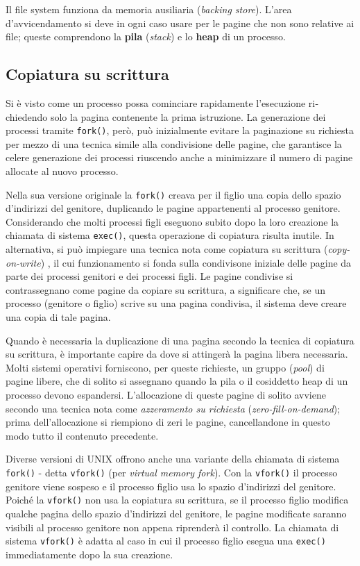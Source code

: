 \documentclass[11pt,a4paper]{article}
\begin{document}
Il file system funziona da memoria ausiliaria (\emph{backing store}). L'area d'avvicendamento si deve in ogni caso usare per le pagine che non sono re­lative ai file; queste comprendono la \textbf{pila} (\emph{stack}) e lo \textbf{heap} di un processo.

\subsection{Copiatura su scrittura}
Si è visto come un processo possa cominciare rapidamente l'esecuzione ri­chiedendo solo la pagina contenente la prima istruzione. La generazione dei processi trami­te \texttt{fork()}, però, può inizialmente evitare la paginazione su richiesta per mezzo di una tec­nica simile alla condivisione delle pagine, che garantisce la celere genera­zione dei processi riuscendo anche a minimizzare il numero di pagine allocate al nuovo processo.

Nella sua versione originale la \texttt{fork()} creava per il figlio una copia dello spa­zio d'indirizzi del genitore, duplicando le pagine appartenenti al processo genitore. Consi­derando che molti processi figli eseguono subito dopo la loro creazione la chiamata di siste­ma \texttt{exec()}, questa operazione di copiatura risulta inutile. In alternativa, si può impiegare
una tecnica nota come copiatura su scrittura (\emph{copy-on-write}) , il cui funzionamento si fonda
sulla condivisone iniziale delle pagine da parte dei processi genitori e dei processi figli. Le
pagine condivise si contrassegnano come pagine da copiare su scrittura, a significare che, se
un processo (genitore o figlio) scrive su una pagina condivisa, il sistema deve creare una copia di tale pagina.

Quando è necessaria la duplicazione di una pagina secondo la tecnica di copiatura su
scrittura, è importante capire da dove si attingerà la pagina libera necessaria. Molti sistemi
operativi forniscono, per queste richieste, un gruppo (\emph{pool}) di pagine libere, che di solito si
assegnano quando la pila o il cosiddetto heap di un processo devono espandersi. L'allocazione di queste pagine di solito avvie­ne secondo una tecnica nota come \emph{azzeramento su richiesta} (\emph{zero-fill-on-demand}); prima
dell'allocazione si riempiono di zeri le pagine, cancellandone in questo modo tutto il conte­nuto precedente.

Diverse versioni di UNIX offrono anche una variante della
chiamata di sistema \texttt{fork()} - detta \texttt{vfork()} (per \emph{virtual memory fork}). Con la \texttt{vfork()} il processo
genitore viene sospeso e il processo figlio usa lo spazio d'indirizzi del genitore. Poiché la
\texttt{vfork()} non usa la copiatura su scrittura, se il processo figlio modifica qualche pagina del­lo spazio d'indirizzi del genitore, le pagine modificate saranno visibili al processo genitore
non appena riprenderà il controllo. La
chiamata di sistema \texttt{vfork()} è adatta al caso in cui il processo figlio esegua una \texttt{exec()}
immediatamente dopo la sua creazione.
\end{document}
